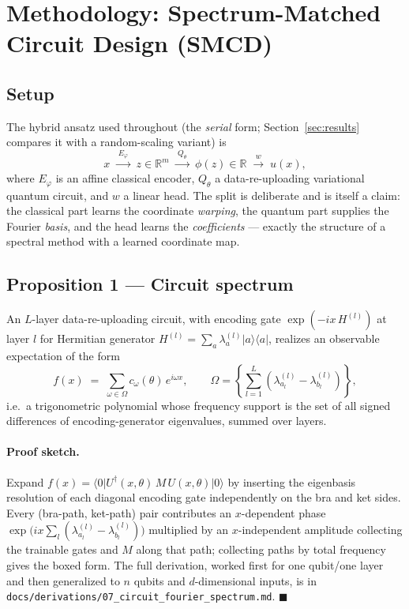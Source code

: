 \section{Methodology: Spectrum-Matched Circuit Design (SMCD)}
\label{sec:methodology}

\subsection{Setup}

The hybrid ansatz used throughout (the \emph{serial} form; Section~\ref{sec:results}
compares it with a random-scaling variant) is
\[
  x \;\xrightarrow{\;E_\varphi\;}\; z \in \mathbb{R}^m
  \;\xrightarrow{\;Q_\theta\;}\; \phi(z) \in \mathbb{R}
  \;\xrightarrow{\;w\;}\; u(x),
\]
where $E_\varphi$ is an affine classical encoder, $Q_\theta$ a data-re-uploading
variational quantum circuit, and $w$ a linear head. The split is deliberate and is itself
a claim: the classical part learns the coordinate \emph{warping}, the quantum part
supplies the Fourier \emph{basis}, and the head learns the \emph{coefficients} --- exactly
the structure of a spectral method with a learned coordinate map.

\subsection{Proposition 1 --- Circuit spectrum}
\label{sec:prop1}

\begin{proposition}
An $L$-layer data-re-uploading circuit, with encoding gate $\exp(-ix\,H^{(l)})$ at layer
$l$ for Hermitian generator $H^{(l)}=\sum_a \lambda_a^{(l)}\lvert a\rangle\langle a\rvert$,
realizes an observable expectation of the form
\[
  f(x) \;=\; \sum_{\omega \in \Omega} c_\omega(\theta)\, e^{i\omega x}, \qquad
  \Omega = \left\{ \sum_{l=1}^{L} \left(\lambda^{(l)}_{a_l} - \lambda^{(l)}_{b_l}\right) \right\},
\]
i.e.\ a trigonometric polynomial whose frequency support is the set of all signed
differences of encoding-generator eigenvalues, summed over layers.
\end{proposition}

\paragraph{Proof sketch.} Expand $f(x) = \langle 0\rvert U^\dagger(x,\theta)\, M\,
U(x,\theta)\lvert 0\rangle$ by inserting the eigenbasis resolution of each diagonal
encoding gate independently on the bra and ket sides. Every (bra-path, ket-path) pair
contributes an $x$-dependent phase $\exp\!\big(ix\sum_l(\lambda^{(l)}_{a_l} -
\lambda^{(l)}_{b_l})\big)$ multiplied by an $x$-independent amplitude collecting the
trainable gates and $M$ along that path; collecting paths by total frequency gives the
boxed form. The full derivation, worked first for one qubit/one layer and then generalized
to $n$ qubits and $d$-dimensional inputs, is in \texttt{docs/derivations/07\_circuit\_fourier\_spectrum.md}. $\blacksquare$

